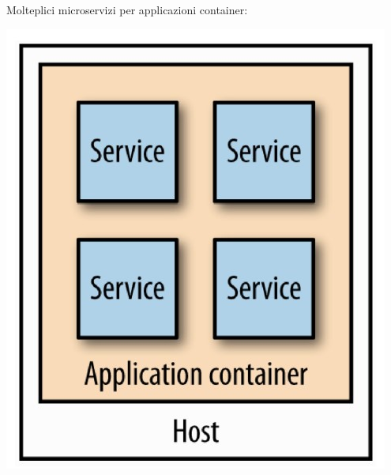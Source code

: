 Molteplici microservizi per applicazioni container:
\begin{center}
    \includegraphics[scale = 0.4]{Images/SOA/Deployment5.jpg}
\end{center}



